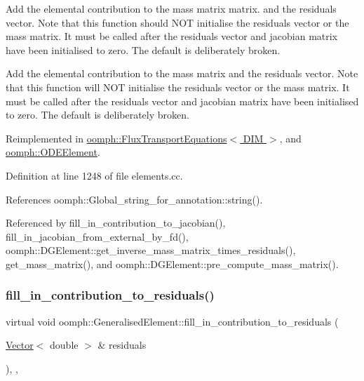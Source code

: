 Add the elemental contribution to the mass matrix matrix. and the residuals vector. Note that this function should N\+OT initialise the residuals vector or the mass matrix. It must be called after the residuals vector and jacobian matrix have been initialised to zero. The default is deliberately broken. 

Add the elemental contribution to the mass matrix and the residuals vector. Note that this function will N\+OT initialise the residuals vector or the mass matrix. It must be called after the residuals vector and jacobian matrix have been initialised to zero. The default is deliberately broken. 

Reimplemented in \hyperlink{classoomph_1_1FluxTransportEquations_a12c2f66dbf817754f548cb51137529fa}{oomph\+::\+Flux\+Transport\+Equations$<$ D\+I\+M $>$}, and \hyperlink{classoomph_1_1ODEElement_aef001ba04ec222921cbdf887ddc6b041}{oomph\+::\+O\+D\+E\+Element}.



Definition at line 1248 of file elements.\+cc.



References oomph\+::\+Global\+\_\+string\+\_\+for\+\_\+annotation\+::string().



Referenced by fill\+\_\+in\+\_\+contribution\+\_\+to\+\_\+jacobian(), fill\+\_\+in\+\_\+jacobian\+\_\+from\+\_\+external\+\_\+by\+\_\+fd(), oomph\+::\+D\+G\+Element\+::get\+\_\+inverse\+\_\+mass\+\_\+matrix\+\_\+times\+\_\+residuals(), get\+\_\+mass\+\_\+matrix(), and oomph\+::\+D\+G\+Element\+::pre\+\_\+compute\+\_\+mass\+\_\+matrix().

\mbox{\label{classoomph_1_1GeneralisedElement_a310c97f515e8504a48179c0e72c550d7}} 
\subsubsection{\texorpdfstring{fill\+\_\+in\+\_\+contribution\+\_\+to\+\_\+residuals()}{fill\_in\_contribution\_to\_residuals()}}
{\footnotesize\ttfamily virtual void oomph\+::\+Generalised\+Element\+::fill\+\_\+in\+\_\+contribution\+\_\+to\+\_\+residuals (\begin{DoxyParamCaption}\item[{\hyperlink{classoomph_1_1Vector}{Vector}$<$ double $>$ \&}]{residuals }\end{DoxyParamCaption})\hspace{0.3cm}{\ttfamily [inline]}, {\ttfamily [protected]}, {\ttfamily [virtual]}}



